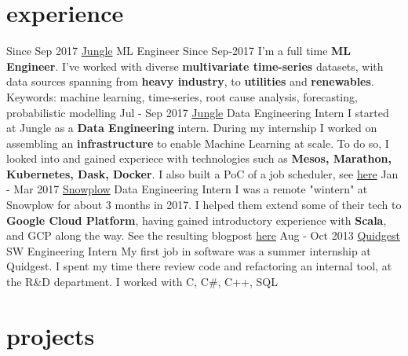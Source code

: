 \documentclass[]{colobas}
\begin{document}
\section{experience}
\entry
  {Since Sep 2017}
  {\href{https://jungle.ai}{Jungle}}
  {ML Engineer}
  {Since Sep-2017 I'm a full time \textbf{ML Engineer}. I've worked with diverse 
  \textbf{multivariate time-series} datasets, with data sources spanning from 
  \textbf{heavy industry}, to \textbf{utilities} and \textbf{renewables}.
  Keywords: machine learning, time-series, root cause analysis, forecasting,
  probabilistic modelling}
\entry
  {Jul - Sep 2017}
  {\href{https://jungle.ai}{Jungle}}
  {Data Engineering Intern}
  {I started at Jungle as a \textbf{Data Engineering} intern. During my internship I
  worked on assembling an \textbf{infrastructure} to enable Machine Learning at scale.
  To do so, I looked into and gained experiece with technologies such as
  \textbf{Mesos, Marathon, Kubernetes, Dask, Docker}. I also built a PoC of a
  job scheduler, see \href{https://github.com/colobas/obras}{here}}
\entry
  {Jan - Mar 2017}
  {\href{https://snowplowanalytics.com}{Snowplow}}
  {Data Engineering Intern}
  {I was a remote "wintern" at Snowplow for about 3 months in 2017. I helped
  them extend some of their tech to \textbf{Google Cloud Platform}, having gained 
  introductory experience with \textbf{Scala}, and GCP along the way. See the
  resulting blogpost \href{https://snowplowanalytics.com/blog/2017/03/30/google-cloud-dataflow-example-project-released/}{here}}
\entry
  {Aug - Oct 2013}
  {\href{https://quidgest.com}{Quidgest}}
  {SW Engineering Intern}
  {My first job in software was a summer internship at Quidgest. I spent my time
  there review code and refactoring an internal tool, at the R\&D department.
  I worked with C, C\#, C++, SQL}
\section{projects}
\end{document}
